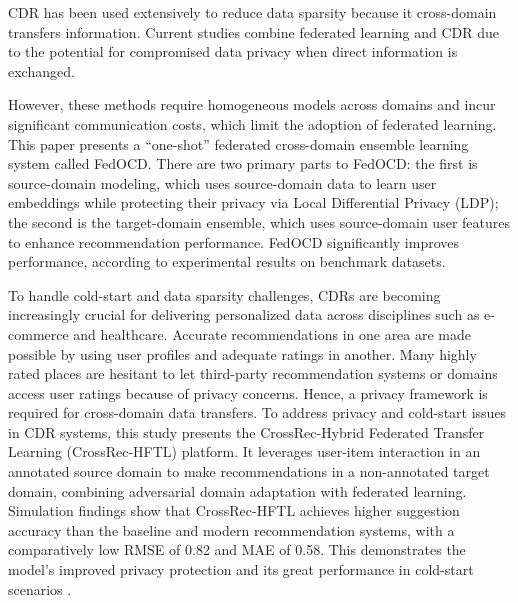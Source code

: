 CDR has been used extensively to reduce data sparsity because it cross-domain transfers information. Current studies combine federated learning and CDR due to the potential for compromised data privacy when direct information is exchanged.

However, these methods require homogeneous models across domains and incur significant communication costs, which limit the adoption of federated learning. This paper presents a “one-shot” federated cross-domain ensemble learning system called FedOCD. There are two primary parts to FedOCD: the first is source-domain modeling, which uses source-domain data to learn user embeddings while protecting their privacy via Local Differential Privacy (LDP); the second is the target-domain ensemble, which uses source-domain user features to enhance recommendation performance. FedOCD significantly improves performance, according to experimental results on benchmark datasets. \cite{ref49}

To handle cold-start and data sparsity challenges, CDRs are becoming increasingly crucial for delivering personalized data across disciplines such as e-commerce and healthcare. Accurate recommendations in one area are made possible by using user profiles and adequate ratings in another. Many highly rated places are hesitant to let third-party recommendation systems or domains access user ratings because of privacy concerns. Hence, a privacy framework is required for cross-domain data transfers. To address privacy and cold-start issues in CDR systems, this study presents the CrossRec-Hybrid Federated Transfer Learning (CrossRec-HFTL) platform. It leverages user-item interaction in an annotated source domain to make recommendations in a non-annotated target domain, combining adversarial domain adaptation with federated learning. Simulation findings show that CrossRec-HFTL achieves higher suggestion accuracy than the baseline and modern recommendation systems, with a comparatively low RMSE of 0.82 and MAE of 0.58. This demonstrates the model's improved privacy protection and its great performance in cold-start scenarios \cite{ref8}.

